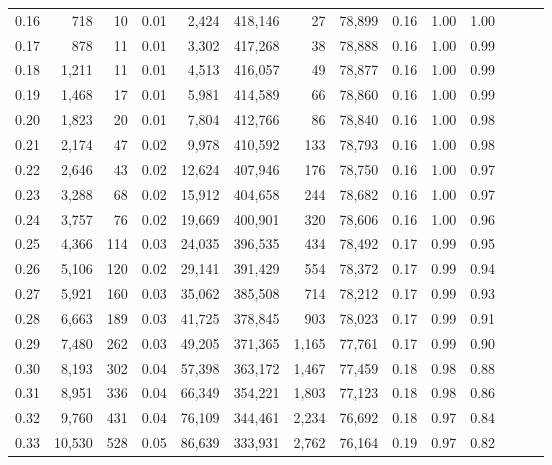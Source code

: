 \begin{tabular}{rrrrrrrrrrrrrr}
0.16 &     718 &     10 &  0.01 &    2,424 &  418,146 &      27 &  78,899 &  0.16 &  1.00 &      1.00 \\
0.17 &     878 &     11 &  0.01 &    3,302 &  417,268 &      38 &  78,888 &  0.16 &  1.00 &      0.99 \\
0.18 &   1,211 &     11 &  0.01 &    4,513 &  416,057 &      49 &  78,877 &  0.16 &  1.00 &      0.99 \\
0.19 &   1,468 &     17 &  0.01 &    5,981 &  414,589 &      66 &  78,860 &  0.16 &  1.00 &      0.99 \\
0.20 &   1,823 &     20 &  0.01 &    7,804 &  412,766 &      86 &  78,840 &  0.16 &  1.00 &      0.98 \\
0.21 &   2,174 &     47 &  0.02 &    9,978 &  410,592 &     133 &  78,793 &  0.16 &  1.00 &      0.98 \\
0.22 &   2,646 &     43 &  0.02 &   12,624 &  407,946 &     176 &  78,750 &  0.16 &  1.00 &      0.97 \\
0.23 &   3,288 &     68 &  0.02 &   15,912 &  404,658 &     244 &  78,682 &  0.16 &  1.00 &      0.97 \\
0.24 &   3,757 &     76 &  0.02 &   19,669 &  400,901 &     320 &  78,606 &  0.16 &  1.00 &      0.96 \\
0.25 &   4,366 &    114 &  0.03 &   24,035 &  396,535 &     434 &  78,492 &  0.17 &  0.99 &      0.95 \\
0.26 &   5,106 &    120 &  0.02 &   29,141 &  391,429 &     554 &  78,372 &  0.17 &  0.99 &      0.94 \\
0.27 &   5,921 &    160 &  0.03 &   35,062 &  385,508 &     714 &  78,212 &  0.17 &  0.99 &      0.93 \\
0.28 &   6,663 &    189 &  0.03 &   41,725 &  378,845 &     903 &  78,023 &  0.17 &  0.99 &      0.91 \\
0.29 &   7,480 &    262 &  0.03 &   49,205 &  371,365 &   1,165 &  77,761 &  0.17 &  0.99 &      0.90 \\
0.30 &   8,193 &    302 &  0.04 &   57,398 &  363,172 &   1,467 &  77,459 &  0.18 &  0.98 &      0.88 \\
0.31 &   8,951 &    336 &  0.04 &   66,349 &  354,221 &   1,803 &  77,123 &  0.18 &  0.98 &      0.86 \\
0.32 &   9,760 &    431 &  0.04 &   76,109 &  344,461 &   2,234 &  76,692 &  0.18 &  0.97 &      0.84 \\
0.33 &  10,530 &    528 &  0.05 &   86,639 &  333,931 &   2,762 &  76,164 &  0.19 &  0.97 &      0.82 \\

\end{tabular}
